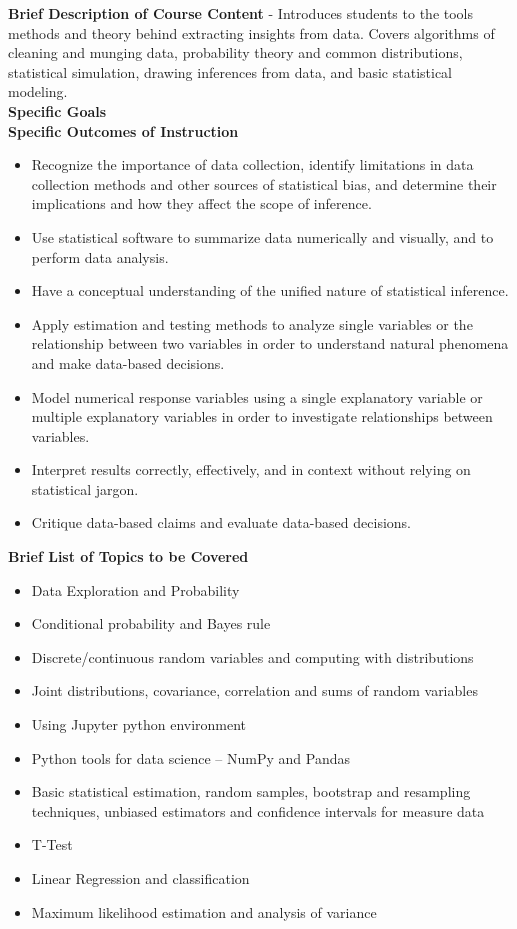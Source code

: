 \documentclass{article}
\begin{document}
\noindent \textbf{Brief Description of Course Content} - Introduces students to the tools methods and theory behind extracting insights from data. Covers algorithms of cleaning and munging data, probability theory and common distributions, statistical simulation, drawing inferences from data, and basic statistical modeling. \\

\noindent \textbf{Specific Goals} \\

\noindent \textbf{Specific Outcomes of Instruction}
\begin{itemize}
    \item Recognize the importance of data collection, identify limitations in data collection methods and other sources of statistical bias, and determine their implications and how they affect the scope of inference.
    \item Use statistical software to summarize data numerically and visually, and to perform data analysis.
    \item Have a conceptual understanding of the unified nature of statistical inference.
    \item Apply estimation and testing methods to analyze single variables or the relationship between two variables in order to understand natural phenomena and make data-based decisions.
    \item Model numerical response variables using a single explanatory variable or multiple explanatory variables in order to investigate relationships between variables.
    \item Interpret results correctly, effectively, and in context without relying on statistical jargon.
    \item Critique data-based claims and evaluate data-based decisions.
\end{itemize}

\noindent \textbf{Brief List of Topics to be Covered}
\begin{itemize}
    \item Data Exploration and Probability
    \item Conditional probability and Bayes rule
    \item Discrete/continuous random variables and computing with distributions
    \item Joint distributions, covariance, correlation and sums of random variables
    \item Using Jupyter python environment
    \item Python tools for data science – NumPy and Pandas
    \item Basic statistical estimation, random samples, bootstrap and resampling techniques, unbiased estimators and confidence intervals for measure data
    \item T-Test
    \item Linear Regression and classification
    \item Maximum likelihood estimation and analysis of variance
\end{itemize}
\end{document}
